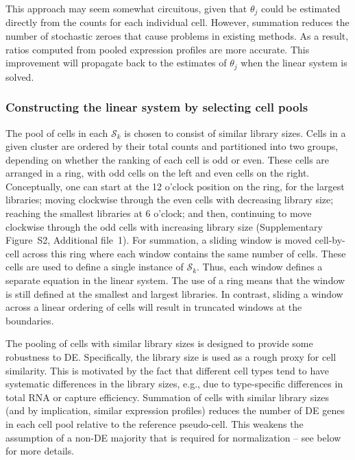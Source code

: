 \documentclass{bmcart}
\newcommand{\suppring}{S2}
\begin{document}
This approach may seem somewhat circuitous, given that $\theta_j$ could be estimated directly from the counts for each individual cell.
However, summation reduces the number of stochastic zeroes that cause problems in existing methods.
As a result, ratios computed from pooled expression profiles are more accurate.
This improvement will propagate back to the estimates of $\theta_j$ when the linear system is solved.

\subsubsection*{Constructing the linear system by selecting cell pools}
The pool of cells in each $\mathcal{S}_{k}$ is chosen to consist of similar library sizes.
Cells in a given cluster are ordered by their total counts and partitioned into two groups, depending on whether the ranking of each cell is odd or even.
These cells are arranged in a ring, with odd cells on the left and even cells on the right.
Conceptually, one can start at the 12 o'clock position on the ring, for the largest libraries; moving clockwise through the even cells with decreasing library size;
reaching the smallest libraries at 6 o'clock; and then, continuing to move clockwise through the odd cells with increasing library size (Supplementary Figure~\suppring{}, Additional file~1).
For summation, a sliding window is moved cell-by-cell across this ring where each window contains the same number of cells.
These cells are used to define a single instance of $\mathcal{S}_{k}$.
Thus, each window defines a separate equation in the linear system.
The use of a ring means that the window is still defined at the smallest and largest libraries.
In contrast, sliding a window across a linear ordering of cells will result in truncated windows at the boundaries.

The pooling of cells with similar library sizes is designed to provide some robustness to DE.
Specifically, the library size is used as a rough proxy for cell similarity.
This is motivated by the fact that different cell types tend to have systematic differences in the library sizes, 
    e.g., due to type-specific differences in total RNA or capture efficiency.
Summation of cells with similar library sizes (and by implication, similar expression profiles) reduces the number of DE genes in each cell pool relative to the reference pseudo-cell.
This weakens the assumption of a non-DE majority that is required for normalization -- see below for more details.
\end{document}
